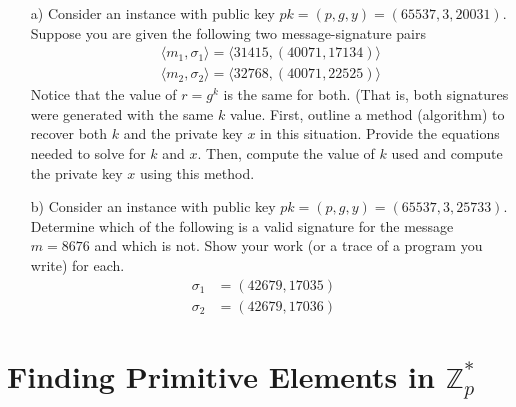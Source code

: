 \documentclass[12pt, letterpaper]{article}
\begin{document}
\begin{itemize}
\item[a)] Consider an instance with public key 
$pk = (p,g,y) = (65537, 3, {20031})$.
Suppose you are given the following two message-signature
pairs 
\begin{align*}
\langle m_1, \sigma_1 \rangle = \langle 31415, (40071, 17134)\rangle \\
\langle m_2, \sigma_2 \rangle = \langle 32768, (40071, 22525)\rangle
\end{align*}
Notice that the value of $r=g^k$ is the same for both.  (That is, both signatures were 
generated with the same $k$ value. First, outline a method (algorithm) to 
recover both $k$ and the private key $x$ in this situation. 
Provide the equations needed to solve for $k$ and $x$.  Then, 
compute the value of $k$ used and compute the private key $x$
using this method.  


\item[b)] Consider an instance with public key $pk = (p,g,y) = (65537, 3, 25733)$.  Determine which of the following is a valid signature for the message $m = 8676$ and which is not.  Show your work (or a trace of a program you write) for each.
\begin{align*}
\sigma_1 &= (42679, 17035) \quad \\ 
\sigma_2 &= (42679, 17036) \quad
\end{align*}


   

\end{itemize}

\newpage

\section{Finding Primitive Elements in $\mathbb{Z}_p^*$}
\end{document}
